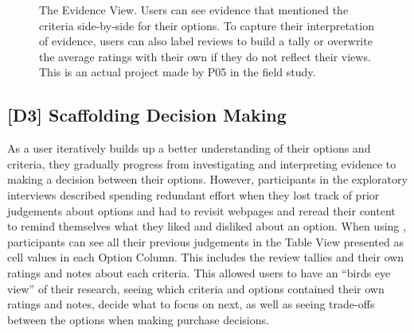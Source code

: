 \begin{figure}
    \centering
    \textcolor{gray}{}
    \caption[The Evidence View for \SYSTEM.]{The Evidence View. Users can see evidence that mentioned the criteria side-by-side for their options. To capture their interpretation of evidence, users can also label reviews to build a tally or overwrite the average ratings with their own if they do not reflect their views. This is an actual project made by P05 in the field study.}
    \label{fig:EvidenceView}
\end{figure}



\subsection{[D3] Scaffolding Decision Making}

As a user iteratively builds up a better understanding of their options and criteria, they gradually progress from investigating and interpreting evidence to making a decision between their options. However, participants in the exploratory interviews described spending redundant effort when they lost track of prior judgements about options and had to revisit webpages and reread their content to remind themselves what they liked and disliked about an option. When using \SYSTEM, participants can see all their previous judgements in the Table View presented as cell values in each Option Column. This includes the review tallies and their own ratings and notes about each criteria. This allowed users to have an ``birds eye view'' of their research, seeing which criteria and options contained their own ratings and notes, decide what to focus on next, as well as seeing trade-offs between the options when making purchase decisions.

